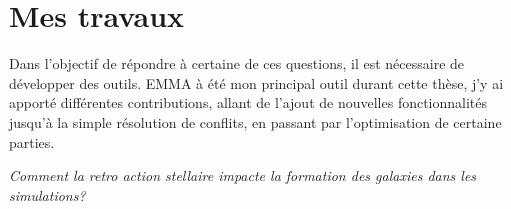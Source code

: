 %
%


\section{Mes travaux}

Dans l'objectif de répondre à certaine de ces questions, il est nécessaire de développer des outils.
EMMA à été mon principal outil durant cette thèse, j'y ai apporté différentes contributions, allant de l'ajout de nouvelles fonctionnalités jusqu'à la simple résolution de conflits, en passant par l'optimisation de certaine parties.

\textit{Comment la retro action stellaire impacte la formation des galaxies dans les simulations?}

